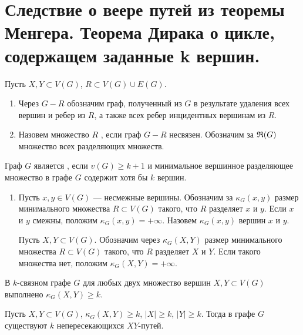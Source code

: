 \section{Следствие о веере путей из теоремы Менгера. Теорема Дирака о цикле, содержащем заданные k вершин.}
\begin{definition}
    Пусть $X, Y \subset V(G)$, $R \subset V(G) \cup E(G)$.
	\begin{enumerate}
		\item Через $G - R$ обозначим граф, полученный из $G$ в результате удаления всех вершин и ребер из $R$, а также всех ребер инцидентных вершинам из $R$.
		\item Назовем множество $R$ , если граф $G -R$ несвязен. Обозначим за $\mathfrak{R}(G)$ множество всех разделяющих множеств. 
	\end{enumerate}
\end{definition}
\begin{definition}
    Граф $G$ является , если  $v(G) \ge k+1$ и минимальное вершинное разделяющее множество в графе $G$ содержит хотя бы $k$ вершин.
\end{definition}
\begin{definition}
    \begin{enumerate}
		\item Пусть $x, y \in V(G)$ --- несмежные вершины. Обозначим за $\kappa_G(x, y)$ размер минимального множества $R \subset V(G)$ такого, что $R$ разделяет $x$ и $y$. Если $x$ и $y$ смежны, положим $\kappa_G(x, y) = + \infty$. Назовем $\kappa_G(x, y) $  вершин $x$ и $y$.

			Пусть $X, Y \subset V(G)$. Обозначим через $\kappa_G(X, Y)$ размер минимального множества $R \subset V(G)$ такого, что $R$ разделяет $X$ и $Y$. Если такого множества нет, положим $\kappa_G(X, Y) = + \infty$.
    \end{enumerate}
\end{definition}
В $k$-связном графе $G$ для любых двух множество вершин $X, Y \subset V(G)$ выполнено $\kappa_G(X, Y) \ge k$.

\begin{theorem}[Менгер, 1927]
    Пусть $X, Y \subset V(G)$, $\kappa_G(X, Y) \ge k$, $\lvert X \rvert \ge k$, $\lvert Y \rvert \ge k$. Тогда в графе $G$ существуют $k$ непересекающихся $XY$-путей.
\end{theorem}

